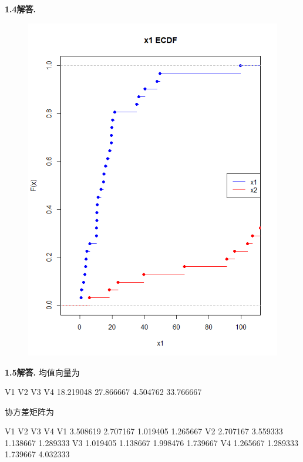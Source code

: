 \documentclass[12pt, a4paper, oneside]{ctexart}
\newenvironment{solution}[1][]{\par\noindent\textbf{#1解答. }}{\smallskip\par}  %
\begin{document}
\begin{solution}[1.4]
\begin{figure}[htbp]
{\begin{minipage}[b]{.2\linewidth}
            \end{minipage}
        }
    \end{figure}
    \begin{figure}[htbp]
        \vspace{-1cm}
        \includegraphics[scale=0.5]{./code/ecdf.png}
    \end{figure}
\end{solution}
\clearpage
\begin{solution}[1.5]
    均值向量为
    \begin{cppcode}
       V1        V2        V3        V4
18.219048 27.866667  4.504762 33.766667
    \end{cppcode}
    协方差矩阵为
    \begin{cppcode}
         V1       V2       V3       V4
V1 3.508619 2.707167 1.019405 1.265667
V2 2.707167 3.559333 1.138667 1.289333
V3 1.019405 1.138667 1.998476 1.739667
V4 1.265667 1.289333 1.739667 4.032333
    \end{cppcode}
\end{solution}
\end{document}
